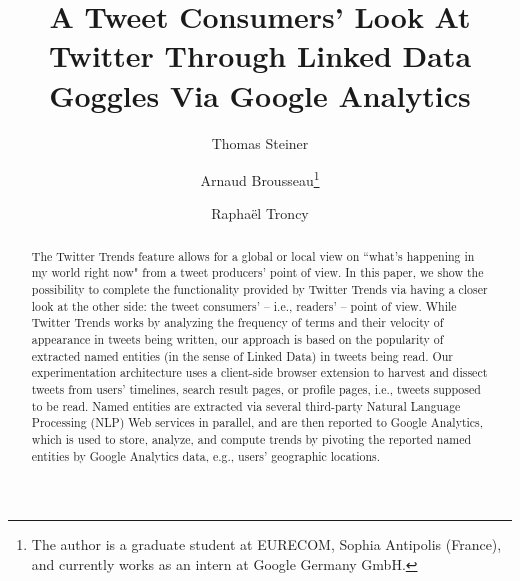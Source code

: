 \documentclass[runningheads,a4paper]{llncs}
\begin{document}
\mainmatter  %

\title{A Tweet Consumers' Look At Twitter Through Linked Data Goggles Via Google Analytics}


%
%
\author{Thomas Steiner \and Arnaud Brousseau\thanks{The author is a graduate student at EURECOM, Sophia Antipolis (France), and currently works as an intern at Google Germany GmbH.} \and Rapha\"{e}l Troncy}


%
%


\maketitle

\begin{abstract}
The Twitter Trends feature allows for a global or local view on ``what's happening in my world right now" from a tweet producers' point of view. In this paper, we show the possibility to complete the functionality provided by Twitter Trends via having a closer look at the other side: the tweet consumers' -- i.e., readers' -- point of view. While Twitter Trends works by analyzing the frequency of terms and their velocity of appearance in tweets being written, our approach is based on the popularity of extracted named entities (in the sense of Linked Data) in tweets being read. Our experimentation architecture uses a client-side browser extension to harvest and dissect tweets from users' timelines, search result pages, or profile pages, i.e., tweets supposed to be read. Named entities are extracted via several third-party Natural Language Processing (NLP) Web services in parallel, and are then reported to Google Analytics, which is used to store, analyze, and compute trends by pivoting the reported named entities by Google Analytics data, e.g., users' geographic locations.
\end{abstract}
\end{document}
